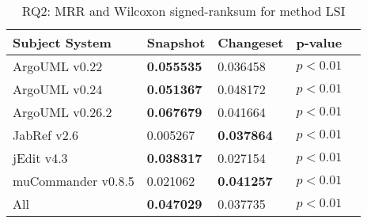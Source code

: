 
\begin{table}[t]
\renewcommand{\arraystretch}{1.3}
\footnotesize
\centering
\caption{RQ2: MRR and Wilcoxon signed-ranksum for method LSI}
\begin{tabular}{l|ll|ll}
   \toprule
    Subject System & Snapshot & Changeset & p-value  \\
    \midrule

ArgoUML v0.22 & {\bf 0.055535 } & 0.036458 & $p < 0.01$ \\
ArgoUML v0.24 & {\bf 0.051367 } & 0.048172 & $p < 0.01$ \\
ArgoUML v0.26.2 & {\bf 0.067679 } & 0.041664 & $p < 0.01$ \\
JabRef v2.6 & 0.005267 & {\bf 0.037864 } & $p < 0.01$ \\
jEdit v4.3 & {\bf 0.038317 } & 0.027154 & $p < 0.01$ \\
muCommander v0.8.5 & 0.021062 & {\bf 0.041257 } & $p < 0.01$ \\
\midrule
All & {\bf 0.047029 } & 0.037735 & $p < 0.01$ \\

    \bottomrule
\end{tabular}
\label{table:rq2:method:lsi}
\end{table}

